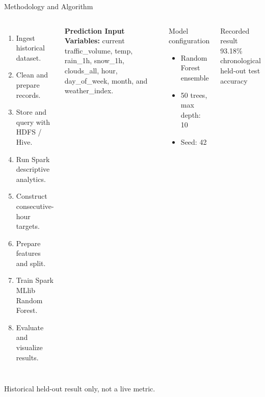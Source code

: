 \documentclass[aspectratio=169,11pt]{beamer}
\begin{document}
\begin{frame}{Methodology and Algorithm}
\begin{columns}[T,onlytextwidth]
\begin{enumerate}\itemsep0pt
\item Ingest historical dataset.
\item Clean and prepare records.
\item Store and query with HDFS / Hive.
\item Run Spark descriptive analytics.
\item Construct consecutive-hour targets.
\item Prepare features and split.
\item Train Spark MLlib Random Forest.
\item Evaluate and visualize results.
\end{enumerate}
\vspace{2mm}
\tiny \textbf{Prediction Input Variables:} current traffic\_volume, temp, rain\_1h, snow\_1h, clouds\_all, hour, day\_of\_week, month, and weather\_index.
\small
\begin{block}{Model configuration}
\begin{itemize}\itemsep-2pt
\item Random Forest ensemble
\item 50 trees, max depth: 10
\item Seed: 42
\end{itemize}
\end{block}
\begin{block}{Recorded result}
\centering \LARGE\textcolor{TrafficBlue}{93.18\%}\\
\tiny chronological held-out test accuracy
\end{block}
\end{columns}
\vspace{1mm}
\tiny Historical held-out result only, not a live metric. 
\end{frame}
\end{document}
